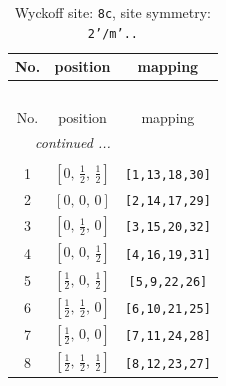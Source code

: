 \documentclass[fleqn,8pt]{jsarticle}
\begin{document}
\renewcommand{\arraystretch}{1.2}
\begin{longtable}{ccc}
\caption{Wyckoff site: {\tt 8c}, site symmetry: {\tt 2'/m'..}}
 \\
 \hline \hline
No. & position & mapping \\ \hline \endfirsthead

\multicolumn{2}{l}{\tablename\ \thetable{}} \\
 \hline \hline
No. & position & mapping \\ \hline \endhead

 \hline \hline
\multicolumn{2}{r}{\footnotesize\it continued ...} \\ \endfoot

 \hline \hline
\multicolumn{2}{r}{} \\ \endlastfoot

1 & $\left[ 0,\, \frac{1}{2},\, \frac{1}{2} \right]$ & {\tt [1,13,18,30]} \\ \hline
2 & $\left[ 0,\, 0,\, 0 \right]$ & {\tt [2,14,17,29]} \\ \hline
3 & $\left[ 0,\, \frac{1}{2},\, 0 \right]$ & {\tt [3,15,20,32]} \\ \hline
4 & $\left[ 0,\, 0,\, \frac{1}{2} \right]$ & {\tt [4,16,19,31]} \\ \hline
5 & $\left[ \frac{1}{2},\, 0,\, \frac{1}{2} \right]$ & {\tt [5,9,22,26]} \\ \hline
6 & $\left[ \frac{1}{2},\, \frac{1}{2},\, 0 \right]$ & {\tt [6,10,21,25]} \\ \hline
7 & $\left[ \frac{1}{2},\, 0,\, 0 \right]$ & {\tt [7,11,24,28]} \\ \hline
8 & $\left[ \frac{1}{2},\, \frac{1}{2},\, \frac{1}{2} \right]$ & {\tt [8,12,23,27]} \\
\end{longtable}
\renewcommand{\arraystretch}{1.2}
\end{document}

